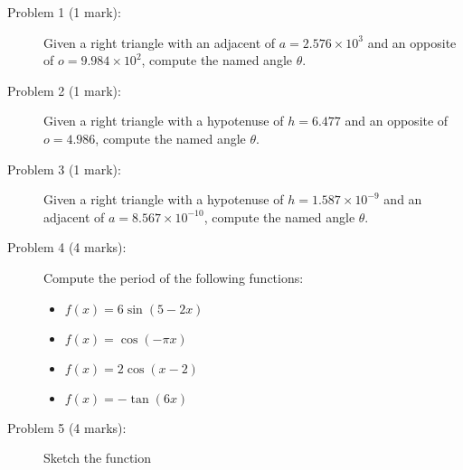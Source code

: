 \documentclass{article}
\begin{document}
\begin{description}
\item[Problem 1 (1 mark):] Given a right triangle with an adjacent of \(a = 2.576 \times 10^3\) and an opposite of \(o = 9.984 \times 10^2\), compute the named angle \(\theta\).   
\item[Problem 2 (1 mark):] Given a right triangle with a hypotenuse of \(h = 6.477\) and an opposite of \(o = 4.986\), compute the named angle \(\theta\). 
\item[Problem 3 (1 mark):] Given a right triangle with a hypotenuse of \(h = 1.587 \times 10^{-9}\) and an adjacent of \(a = 8.567 \times 10^{-10}\), compute the named angle \(\theta\).
\item[Problem 4 (4 marks):] Compute the period of the following functions:
	\begin{itemize}
	\item \(f(x) = 6\sin(5 - 2x)\)
	\item \(f(x) = \cos(-\pi x)\)
	\item \(f(x) = 2\cos(x - 2)\)
	\item \(f(x) = -\tan(6x)\)
	\end{itemize}  
\item[Problem 5 (4 marks):] Sketch the function
\end{description}
\end{document}
